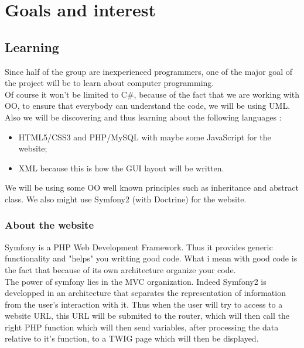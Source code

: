 \documentclass[article]{report} %
\begin{document}
				\chapter{Goals and interest}
						\section{Learning}
								Since half of the group are inexperienced programmers, one of the major goal of the project will be to learn about computer programming.\\
								
								Of course it won't be limited to C\#, because of the fact that we are working with OO, to ensure that everybody can understand the code, we will be using UML.\newline
								Also we will be discovering and thus learning about the following languages : 
								\begin{itemize}
										\item HTML5/CSS3 and PHP/MySQL with maybe some JavaScript for the website;
										\item XML because this is how the GUI layout will be written.
								\end{itemize}
															
								We will be using some OO well known principles such as inheritance and abstract class. We also might use Symfony2 (with Doctrine) for the website.
							  
							  \subsection{About the website}
							  		Symfony is a PHP Web Development Framework. Thus it provides generic functionality and "helps" you writting good code. What i mean with good code is the fact that because of its own architecture organize your code.\\
							  		
							  		The power of symfony lies in the MVC organization. Indeed Symfony2 is developped in an architecture that separates the representation of information from the user's interaction with it.\newline
							  		 Thus when the user will try to access to a website URL, this URL will be submited to the router, which will then call the right PHP function which will then send variables, after processing the data relative to it's function, to a TWIG page which will then be displayed.
							  		 
\end{document}
